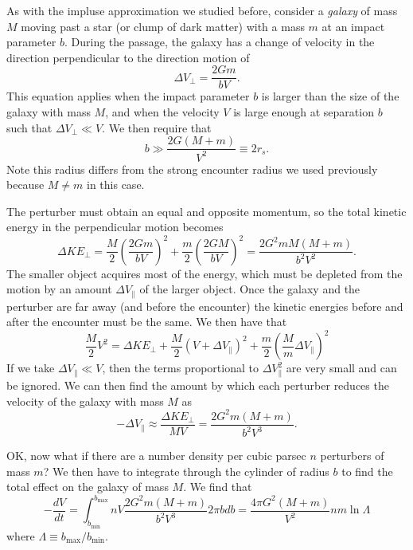 \documentclass[]{article}
\begin{document}
As with the impluse approximation we studied before, consider a
{\it galaxy} of mass $M$ moving past a star (or clump of dark matter)
with a mass $m$ at an impact parameter $b$.  During the passage, the
galaxy has a change of velocity in the direction perpendicular to the
direction motion of
\begin{equation}
\Delta V_{\perp} = \frac{2Gm}{bV}.
\end{equation}
\noindent
This equation applies when the impact parameter $b$ is larger than the
size of the galaxy with mass $M$, and when the velocity $V$ is large
enough at separation $b$ such that $\Delta V_{\perp}\ll V$.  We then
require that
\begin{equation}
b \gg \frac{2G(M+m)}{V^2} \equiv 2 r_s.
\end{equation}
\noindent
Note this radius differs from the strong encounter radius we used
previously because $M\ne m$ in this case.

The perturber must obtain an equal and opposite momentum, so the
total kinetic energy in the perpendicular motion becomes
\begin{equation}
\Delta KE_{\perp} = \frac{M}{2}\left(\frac{2Gm}{bV}\right)^2 + \frac{m}{2}\left(\frac{2GM}{bV}\right)^2 = \frac{2G^2mM(M+m)}{b^2 V^2}.
\end{equation}
\noindent
The smaller object acquires most of the energy, which must be depleted from the motion by an amount $\Delta V_{\parallel}$ of the
larger object.  Once the galaxy and the perturber are far away (and before the encounter) the kinetic energies 
before and after the encounter must be the same.  We then have that
\begin{equation}
\frac{M}{2}V^2 = \Delta KE_{\perp} + \frac{M}{2}(V + \Delta V_{\parallel})^2 + \frac{m}{2}\left(\frac{M}{m} \Delta V_{\parallel} \right)^2
\end{equation}
\noindent
If we take $\Delta V_{\parallel} \ll V$, then the terms proportional to $\Delta V_{\parallel}^2$ are very small and
can be ignored.  We can then find the amount by which each perturber reduces the velocity of the galaxy with
mass $M$ as
\begin{equation}
- \Delta V_{\parallel} \approx \frac{\Delta KE_{\perp}}{M V} = \frac{2G^2 m(M+m)}{b^2 V^3}.
\end{equation}

OK, now what if there are a number density per cubic parsec $n$ perturbers of mass $m$?  
We then have to integrate through the cylinder of radius $b$ to find the total
effect on the galaxy of mass $M$.  We find that
\begin{equation}
-\frac{dV}{dt} = \int_{b_{\mathrm{min}}}^{b_{\mathrm{max}}} n V \frac{2G^2 m (M+m)}{b^2 V^3} 2\pi b db = \frac{4\pi G^2(M+m)}{V^2} n m \ln \Lambda
\end{equation}
\noindent
where $\Lambda\equiv b_{\mathrm{max}}/b_{\mathrm{min}}$.
\end{document}
